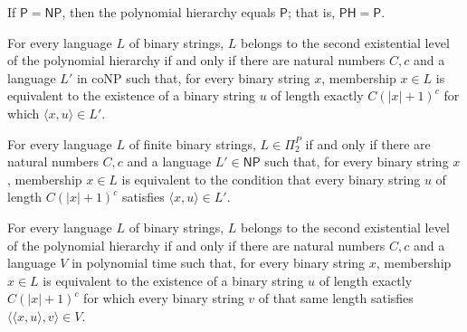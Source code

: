 \begin{theorem}
\label{Complexity.PH_eq_P_of_P_eq_NP}
\leanok
{}
If $\mathsf{P}=\mathsf{NP}$, then the polynomial hierarchy equals $\mathsf{P}$; that is,
$\mathsf{PH}=\mathsf{P}$.
\end{theorem}

\begin{theorem}
\label{Complexity.mem_SigmaP_two_iff}
\leanok
{}
For every language $L$ of binary strings, $L$ belongs to the second existential level of
the polynomial hierarchy if and only if there are natural numbers $C,c$ and a language
$L'$ in coNP such that, for every binary string $x$, membership $x\in L$ is equivalent
to the existence of a binary string $u$ of length exactly $C(|x|+1)^c$ for which
$\langle x,u\rangle\in L'$.
\end{theorem}

\begin{theorem}
\label{Complexity.mem_PiP_two_iff}
\leanok
{}
For every language $L$ of finite binary strings, $L\in\Pi_2^P$ if and only if there are
natural numbers $C,c$ and a language $L'\in\mathsf{NP}$ such that, for every binary
string $x$, membership $x\in L$ is equivalent to the condition that every binary string
$u$ of length $C(|x|+1)^c$ satisfies $\langle x,u\rangle\in L'$.
\end{theorem}

\begin{theorem}
\label{Complexity.mem_SigmaP_two_iff_exists_forall}
\leanok
{}
For every language $L$ of binary strings, $L$ belongs to the second existential level of
the polynomial hierarchy if and only if there are natural numbers $C,c$ and a language
$V$ in polynomial time such that, for every binary string $x$, membership $x\in L$ is
equivalent to the existence of a binary string $u$ of length exactly $C(|x|+1)^c$ for
which every binary string $v$ of that same length satisfies $\langle\langle
x,u\rangle,v\rangle\in V$.
\end{theorem}

